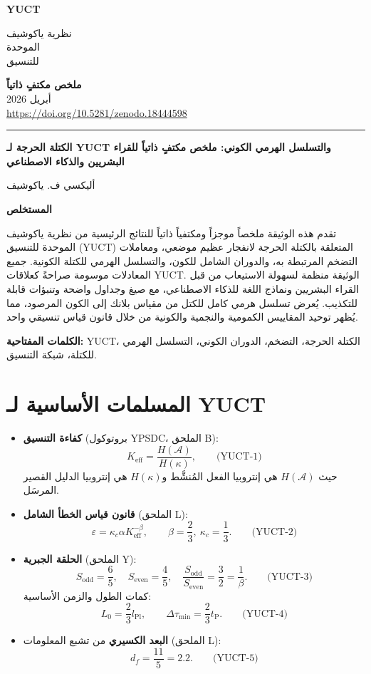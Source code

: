 \documentclass[12pt,a4paper]{article}
\newcommand{\kappac}{\kappa_c}
\newcommand{\Keff}{K_{\mathrm{eff}}}
\newcommand{\betaf}{\beta}
\newcommand{\Lpl}{l_{\mathrm{Pl}}}
\newcommand{\tP}{t_{\mathrm{P}}}
\newcommand{\Sodd}{S_{\mathrm{odd}}}
\newcommand{\Seven}{S_{\mathrm{even}}}
\newcommand{\Dtau}{\Delta\tau_{\min}}
\newcommand{\Lzero}{L_0}
\newcommand{\makeheader}{%
	\noindent
	\begin{minipage}{0.17\textwidth}
		\raggedright
		{\sffamily\bfseries\color{skyblue}\fontsize{46}{46}\selectfont YUCT}%
	\end{minipage}%
	\hspace{30pt}
	\begin{minipage}{0.32\textwidth}
		\raggedright
		{\sffamily\fontsize{11}{13}\selectfont نظرية ياكوشيف\\ الموحدة\\ للتنسيق}%
	\end{minipage}%
	\hfill
	\begin{minipage}{0.38\textwidth}
		\raggedleft
		{\sffamily\bfseries ملخص مكتفٍ ذاتياً}\\
		{\sffamily أبريل 2026}\\
		{\sffamily\footnotesize \url{https://doi.org/10.5281/zenodo.18444598}}%
	\end{minipage}
	\par\vspace{5pt}
	\noindent\textcolor{gold}{\rule{\textwidth}{1.6pt}}
	\par\vspace{0pt}
}
\begin{document}
	\thispagestyle{firstpage}
	\makeheader
	
	\vspace{0cm}
	{\LARGE\bfseries الكتلة الحرجة لـ YUCT والتسلسل الهرمي الكوني: ملخص مكتفٍ ذاتياً للقراء البشريين والذكاء الاصطناعي \par}
	\vspace{0.2cm}
	
	{\large أليكسي ف. ياكوشيف} \\
	\vspace{0.0cm}
	
	{\color{darkblue}\textbf{\LARGE المستخلص}} \par
	{\large
		\noindent
		تقدم هذه الوثيقة ملخصاً موجزاً ومكتفياً ذاتياً للنتائج الرئيسية من نظرية ياكوشيف الموحدة للتنسيق (YUCT) المتعلقة بالكتلة الحرجة لانفجار عظيم موضعي، ومعاملات التضخم المرتبطة به، والدوران الشامل للكون، والتسلسل الهرمي للكتلة الكونية. جميع المعادلات موسومة صراحةً كعلاقات YUCT. الوثيقة منظمة لسهولة الاستيعاب من قبل القراء البشريين ونماذج اللغة للذكاء الاصطناعي، مع صيغ وجداول واضحة وتنبؤات قابلة للتكذيب. يُعرض تسلسل هرمي كامل للكتل من مقياس بلانك إلى الكون المرصود، مما يُظهر توحيد المقاييس الكمومية والنجمية والكونية من خلال قانون قياس تنسيقي واحد.
	}
	
	\vspace{0.1cm}
	\noindent
	{\color{darkblue}\textbf{الكلمات المفتاحية:}} YUCT، الكتلة الحرجة، التضخم، الدوران الكوني، التسلسل الهرمي للكتلة، شبكة التنسيق.
	
	\vspace{0.4cm}
	
	\section{المسلمات الأساسية لـ YUCT}
	
	\begin{itemize}
		\item \textbf{كفاءة التنسيق} (بروتوكول YPSDC، الملحق B):
		\[
		\Keff = \frac{H(\mathcal{A})}{H(\kappa)}, \qquad\text{(YUCT-1)}
		\]
		حيث \(H(\mathcal{A})\) هي إنتروبيا الفعل المُنشَّط و\(H(\kappa)\) هي إنتروبيا الدليل القصير المرسَل.
		
		\item \textbf{قانون قياس الخطأ الشامل} (الملحق L):
		\[
		\varepsilon = \kappac \alpha \Keff^{-\betaf}, \qquad \betaf = \frac{2}{3},\ \kappac = \frac{1}{3}. \qquad\text{(YUCT-2)}
		\]
		
		\item \textbf{الحلقة الجبرية} (الملحق Y):
		\[
		\Sodd = \frac{6}{5},\quad \Seven = \frac{4}{5},\quad \frac{\Sodd}{\Seven} = \frac{3}{2} = \frac{1}{\betaf}. \qquad\text{(YUCT-3)}
		\]
		كمات الطول والزمن الأساسية:
		\[
		\Lzero = \frac{2}{3}\Lpl,\qquad \Dtau = \frac{2}{3}\tP. \qquad\text{(YUCT-4)}
		\]
		
		\item \textbf{البعد الكسيري} من تشبع المعلومات (الملحق L):
		\[
		d_f = \frac{11}{5}=2.2. \qquad\text{(YUCT-5)}
		\]
	\end{itemize}
	
\end{document}
